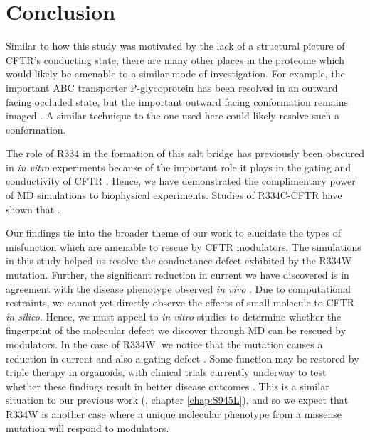 \section{Conclusion}

Similar to how this study was motivated by the lack of a structural picture of CFTR's conducting state, there are many other places in the proteome which would likely be amenable to a similar mode of investigation. For example, the important ABC transporter P-glycoprotein has been resolved in an outward facing occluded state, but the important outward facing conformation remains imaged \cite{kim2018a}. A similar technique to the one used here could likely resolve such a conformation.

The role of R334 in the formation of this salt bridge has previously been obscured in \textit{in vitro} experiments because of the important role it plays in the gating and conductivity of CFTR \cite{gong2003}. Hence, we have demonstrated the complimentary power of MD simulations to biophysical experiments. Studies of R334C-CFTR have shown that \cite{zhang2005, rahman2013}. 

Our findings tie into the broader theme of our work to elucidate the types of misfunction which are amenable to rescue by CFTR modulators. The simulations in this study helped us resolve the conductance defect exhibited by the R334W mutation. Further, the significant reduction in current we have discovered is in agreement with the disease phenotype observed \textit {in vivo} \cite{}. Due to computational restraints, we cannot yet directly observe the effects of small molecule to CFTR \textit{in silico}. Hence, we must appeal to \textit{in vitro} studies to determine whether the fingerprint of the molecular defect we discover through MD can be rescued by modulators. In the case of R334W, we notice that the mutation causes a reduction in current and also a gating defect \cite{}. Some function may be restored by triple therapy in organoids, with clinical trials currently underway to test whether these findings result in better disease outcomes \cite{}. This is a similar situation to our previous work (\cite{wong2022a, wong2022}, chapter \ref{chap:S945L}), and so we expect that R334W is another case where a unique molecular phenotype from a missense mutation will respond to modulators.


